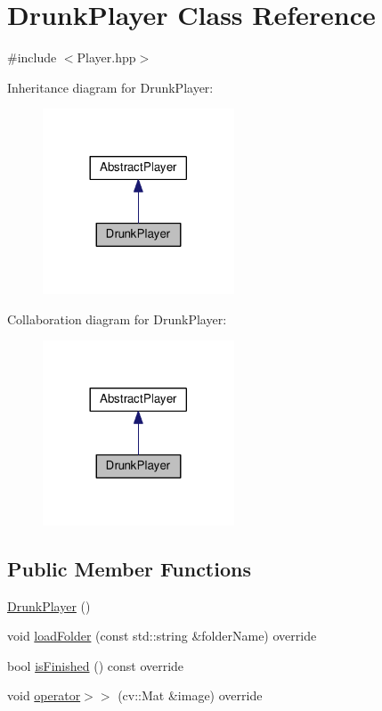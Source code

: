 \hypertarget{classDrunkPlayer}{}\section{Drunk\+Player Class Reference}
\label{classDrunkPlayer}


{\ttfamily \#include $<$Player.\+hpp$>$}



Inheritance diagram for Drunk\+Player\+:\nopagebreak
\begin{figure}[H]
\begin{center}
\leavevmode
\includegraphics[width=161pt]{classDrunkPlayer__inherit__graph}
\end{center}
\end{figure}


Collaboration diagram for Drunk\+Player\+:\nopagebreak
\begin{figure}[H]
\begin{center}
\leavevmode
\includegraphics[width=161pt]{classDrunkPlayer__coll__graph}
\end{center}
\end{figure}
\subsection*{Public Member Functions}
\begin{DoxyCompactItemize}
\item 
\hyperlink{classDrunkPlayer_a39c64a774a19456f3a4c194ec5e1131f}{Drunk\+Player} ()
\item 
void \hyperlink{classDrunkPlayer_a235e60ea8a97c4d26277b066c2cebe80}{load\+Folder} (const std\+::string \&folder\+Name) override
\item 
bool \hyperlink{classDrunkPlayer_a9c032dda7df01fafc757fb1f4e265bb4}{is\+Finished} () const override
\item 
void \hyperlink{classDrunkPlayer_a2662f5010e15c95ca6639f56f012aed1}{operator$>$$>$} (cv\+::\+Mat \&image) override
\end{DoxyCompactItemize}
